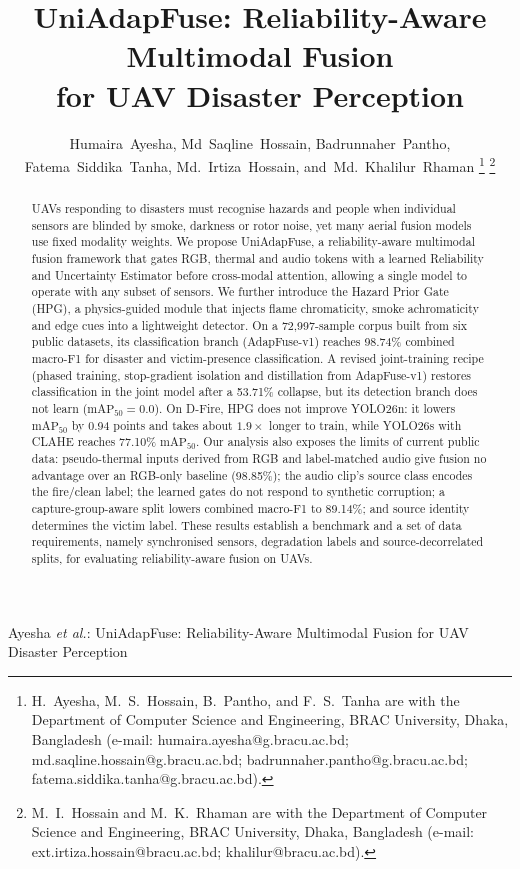 \documentclass[journal]{IEEEtran}
\begin{document}
\title{UniAdapFuse: Reliability-Aware Multimodal Fusion\\ for UAV Disaster Perception}

\author{Humaira~Ayesha,
        Md~Saqline~Hossain,
        Badrunnaher~Pantho,
        Fatema~Siddika~Tanha,
        Md.~Irtiza~Hossain,
        and~Md.~Khalilur~Rhaman%
\thanks{H.~Ayesha, M.~S.~Hossain, B.~Pantho, and F.~S.~Tanha are with the Department of Computer Science and Engineering, BRAC University, Dhaka, Bangladesh (e-mail: humaira.ayesha@g.bracu.ac.bd; md.saqline.hossain@g.bracu.ac.bd; badrunnaher.pantho@g.bracu.ac.bd; fatema.siddika.tanha@g.bracu.ac.bd).}%
\thanks{M.~I.~Hossain and M.~K.~Rhaman are with the Department of Computer Science and Engineering, BRAC University, Dhaka, Bangladesh (e-mail: ext.irtiza.hossain@bracu.ac.bd; khalilur@bracu.ac.bd).}}

%
{Ayesha \MakeLowercase{\textit{et al.}}: UniAdapFuse: Reliability-Aware Multimodal Fusion for UAV Disaster Perception}

\maketitle

\begin{abstract}
UAVs responding to disasters must recognise hazards and people when individual sensors are blinded by smoke, darkness or rotor noise, yet many aerial fusion models use fixed modality weights. We propose UniAdapFuse, a reliability-aware multimodal fusion framework that gates RGB, thermal and audio tokens with a learned Reliability and Uncertainty Estimator before cross-modal attention, allowing a single model to operate with any subset of sensors. We further introduce the Hazard Prior Gate (HPG), a physics-guided module that injects flame chromaticity, smoke achromaticity and edge cues into a lightweight detector. On a 72{,}997-sample corpus built from six public datasets, its classification branch (AdapFuse-v1) reaches 98.74\% combined macro-F1 for disaster and victim-presence classification. A revised joint-training recipe (phased training, stop-gradient isolation and distillation from AdapFuse-v1) restores classification in the joint model after a 53.71\% collapse, but its detection branch does not learn ($\mathrm{mAP}_{50}=0.0$). On D-Fire, HPG does not improve YOLO26n: it lowers $\mathrm{mAP}_{50}$ by 0.94 points and takes about $1.9\times$ longer to train, while YOLO26s with CLAHE reaches 77.10\% $\mathrm{mAP}_{50}$. Our analysis also exposes the limits of current public data: pseudo-thermal inputs derived from RGB and label-matched audio give fusion no advantage over an RGB-only baseline (98.85\%); the audio clip's source class encodes the fire/clean label; the learned gates do not respond to synthetic corruption; a capture-group-aware split lowers combined macro-F1 to 89.14\%; and source identity determines the victim label. These results establish a benchmark and a set of data requirements, namely synchronised sensors, degradation labels and source-decorrelated splits, for evaluating reliability-aware fusion on UAVs.
\end{abstract}
\end{document}
